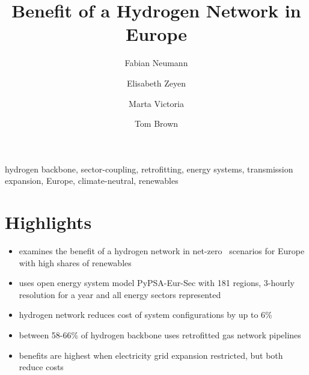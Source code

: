 \documentclass[12pt,preprint]{elsarticle}
\newcommand{\co}{\ce{CO2}~}
\begin{document}
\begin{frontmatter}

	\title{Benefit of a Hydrogen Network in Europe}

	\author[tubaddress]{Fabian Neumann}
	\author[tubaddress]{Elisabeth Zeyen}
	\author[aarhus,aarhus2]{Marta Victoria}
	\author[tubaddress]{Tom Brown}
	\address[tubaddress]{Department of Digital Transformation in Energy Systems, Institute of Energy Technology, Technische Universität Berlin, Fakultät III, Einsteinufer 25 (TA 8), 10587 Berlin, Germany}
	\address[aarhus]{Department of Mechanical and Production Engineering, Aarhus University, Inge Lehmanns Gade 10, 8000 Aarhus, Denmark}
	\address[aarhus2]{iCLIMATE Interdisciplinary Centre for Climate Change, Aarhus University}

	\begin{abstract}
		
	\end{abstract}

	\begin{keyword}
		hydrogen backbone, sector-coupling, retrofitting, energy systems, transmission expansion, Europe, climate-neutral, renewables
	\end{keyword}


\end{frontmatter}


% 

\section*{Highlights}

\begin{itemize}
	\item examines the benefit of a hydrogen network in net-zero \co scenarios for Europe with high shares of renewables
	\item uses open energy system model PyPSA-Eur-Sec with 181 regions, 3-hourly resolution for a year and all energy sectors represented
	\item hydrogen network reduces cost of system configurations by up to 6\%
	\item between 58-66\% of hydrogen backbone uses retrofitted gas network pipelines
	\item benefits are highest when electricity grid expansion restricted, but both reduce costs
\end{itemize}
\end{document}
